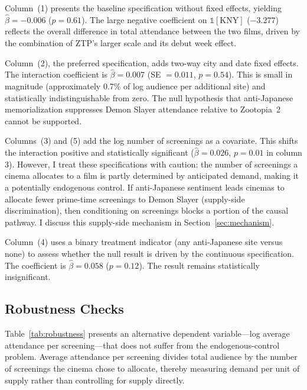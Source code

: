 \documentclass[12pt]{article}
\begin{document}
Column~(1) presents the baseline specification without fixed effects, yielding $\hat{\beta} = -0.006$ ($p = 0.61$). The large negative coefficient on $\mathbb{1}[\text{KNY}]$ ($-3.277$) reflects the overall difference in total attendance between the two films, driven by the combination of ZTP's larger scale and its debut week effect.

Column~(2), the preferred specification, adds two-way city and date fixed effects. The interaction coefficient is $\hat{\beta} = 0.007$ (SE $= 0.011$, $p = 0.54$). This is small in magnitude (approximately 0.7\% of log audience per additional site) and statistically indistinguishable from zero. The null hypothesis that anti-Japanese memorialization suppresses Demon Slayer attendance relative to Zootopia~2 cannot be supported.

Columns~(3) and (5) add the log number of screenings as a covariate. This shifts the interaction positive and statistically significant ($\hat{\beta} = 0.026$, $p = 0.01$ in column 3). However, I treat these specifications with caution: the number of screenings a cinema allocates to a film is partly determined by anticipated demand, making it a potentially endogenous control. If anti-Japanese sentiment leads cinemas to allocate fewer prime-time screenings to Demon Slayer (supply-side discrimination), then conditioning on screenings blocks a portion of the causal pathway. I discuss this supply-side mechanism in Section~\ref{sec:mechanism}.

Column~(4) uses a binary treatment indicator (any anti-Japanese site versus none) to assess whether the null result is driven by the continuous specification. The coefficient is $\hat{\beta} = 0.058$ ($p = 0.12$). The result remains statistically insignificant.

\subsection{Robustness Checks}

Table~\ref{tab:robustness} presents an alternative dependent variable---log average attendance per screening---that does not suffer from the endogenous-control problem. Average attendance per screening divides total audience by the number of screenings the cinema chose to allocate, thereby measuring demand per unit of supply rather than controlling for supply directly.
\end{document}

